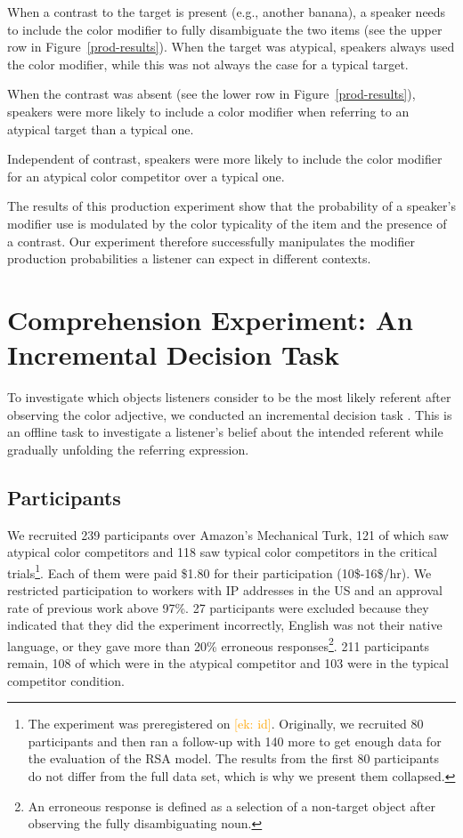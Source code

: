 \documentclass[10pt,letterpaper]{article}
\newcommand{\ek}[1]{\textcolor{Orange}{[ek: #1]}}
\begin{document}
When a contrast to the target is present (e.g., another banana), a speaker needs to include the color modifier to fully disambiguate the two items (see the upper row in Figure~\ref{prod-results}). When the target was atypical, speakers always used the color modifier, while this was not always the case for a typical target.

When the contrast was absent (see the lower row in Figure~\ref{prod-results}), speakers were more likely to include a color modifier when referring to an atypical target than a typical one.

Independent of contrast, speakers were more likely to include the color modifier for an atypical color competitor over a typical one.

The results of this production experiment show that the probability of a speaker's modifier use is modulated by the color typicality of the item and the presence of a contrast. Our experiment therefore successfully manipulates the modifier production probabilities a listener can expect in different contexts.


\section{Comprehension Experiment: An Incremental Decision Task}
To investigate which objects listeners consider to be the most likely referent after observing the color adjective, we conducted an incremental decision task \cite{Qing:2018}. This is an offline task to investigate a listener's belief about the intended referent while gradually unfolding the referring expression.


\subsection{Participants}
We recruited 239 participants over Amazon's Mechanical Turk, 121 of which saw atypical color competitors and 118 saw typical color competitors in the critical trials\footnote{The experiment was preregistered on \ek{id}. Originally, we recruited 80 participants and then ran a follow-up with 140 more to get enough data for the evaluation of the RSA model. The results from the first 80 participants do not differ from the full data set, which is why we present them collapsed.}. Each of them were paid \$1.80 for their participation (10\$-16\$/hr). We restricted participation to workers with IP addresses in the US and an approval rate of previous work above 97\%. 
27 participants were excluded because they indicated that they did the experiment incorrectly, English was not their native language, or they gave more than 20\% erroneous responses\footnote{An erroneous response is defined as a selection of a non-target object after observing the fully disambiguating noun.}. 211 participants remain, 108 of which were in the atypical competitor and 103 were in the typical competitor condition. 
\end{document}
